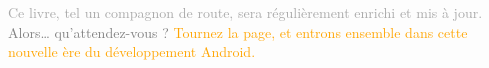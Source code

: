 \newpage
\noindent 
{\footnotesize \textcolor{darkgray}{Ce livre, tel un compagnon de route, sera régulièrement enrichi et mis à jour.}}
\\
{\footnotesize \textcolor{gray}{Alors… qu’attendez-vous ?}}
\footnotesize \textcolor{orange}{{Tournez la page, et entrons ensemble dans cette nouvelle ère du développement Android.}}